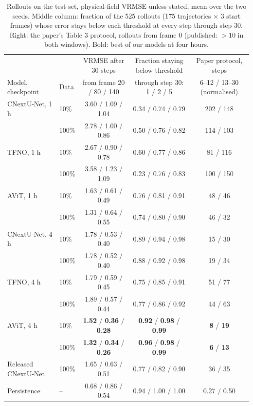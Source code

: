 \documentclass[11pt]{article}
\begin{document}
\begin{table}[tp]
\centering\footnotesize
\setlength{\tabcolsep}{5pt}
\begin{tabular}{@{}llccc@{}}
\toprule
& & VRMSE after 30 steps & Fraction staying below threshold & Paper protocol, steps \\
Model, checkpoint & Data & from frame 20 / 80 / 140 & through step 30: 1 / 2 / 5 & 6--12 / 13--30 (normalised) \\
\midrule
CNextU-Net, 1 h & 10\% & 3.60 / 1.09 / 1.04 & 0.34 / 0.74 / 0.79 & 202 / 148 \\
                & 100\% & 2.78 / 1.00 / 0.86 & 0.50 / 0.76 / 0.82 & 114 / 103 \\
TFNO, 1 h & 10\% & 2.67 / 0.90 / 0.78 & 0.60 / 0.77 / 0.86 & 81 / 116 \\
          & 100\% & 3.58 / 1.23 / 1.09 & 0.23 / 0.76 / 0.83 & 100 / 150 \\
AViT, 1 h & 10\% & 1.63 / 0.61 / 0.49 & 0.76 / 0.81 / 0.91 & 48 / 46 \\
          & 100\% & 1.31 / 0.64 / 0.55 & 0.74 / 0.80 / 0.90 & 46 / 32 \\
\midrule
CNextU-Net, 4 h & 10\% & 1.78 / 0.53 / 0.40 & 0.89 / 0.94 / 0.98 & 15 / 30 \\
                & 100\% & 1.78 / 0.52 / 0.40 & 0.88 / 0.92 / 0.98 & 19 / 34 \\
TFNO, 4 h & 10\% & 1.79 / 0.59 / 0.45 & 0.75 / 0.85 / 0.91 & 51 / 77 \\
          & 100\% & 1.89 / 0.57 / 0.44 & 0.77 / 0.86 / 0.92 & 44 / 63 \\
AViT, 4 h & 10\% & \textbf{1.52} / \textbf{0.36} / \textbf{0.28} & \textbf{0.92} / \textbf{0.98} / \textbf{0.99} & \textbf{8} / \textbf{19} \\
          & 100\% & \textbf{1.32} / \textbf{0.34} / \textbf{0.26} & \textbf{0.96} / \textbf{0.98} / \textbf{0.99} & \textbf{6} / \textbf{13} \\
\midrule
Released CNextU-Net & 100\% & 1.65 / 0.63 / 0.51 & 0.77 / 0.82 / 0.90 & 36 / 35 \\
Persistence & -- & 0.68 / 0.86 / 0.54 & 0.94 / 1.00 / 1.00 & 0.27 / 0.50 \\
\bottomrule
\end{tabular}
\caption{Rollouts on the test set, physical-field VRMSE unless stated, mean over the two seeds. Middle column:
fraction of the 525 rollouts (175 trajectories $\times$ 3 start frames) whose error stays below each threshold at
every step through step 30. Right: the paper's Table 3 protocol, rollouts from frame 0 (published: $>10$ in both
windows). Bold: best of our models at four hours.}
\label{tab:rollout}
\end{table}
\end{document}
